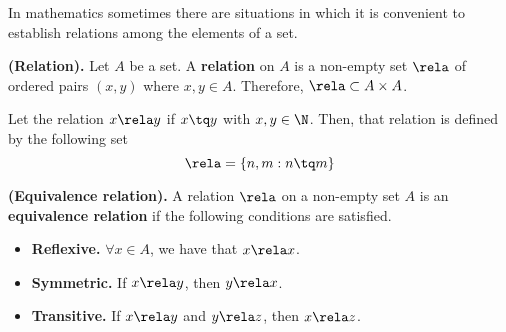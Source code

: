 In mathematics sometimes there are situations in which it is convenient to establish relations among the elements of a set.

\begin{definition}
    \textbf{(Relation).} Let $A$ be a set. A \textbf{relation} on $A$ is a non-empty set $\rela$ of ordered pairs $\left( x, y \right) $ where $x, y\in A$. Therefore, $\rela\subset A\times A$.
\end{definition}

\begin{example}[]
   Let the relation $x\rela y$ if $x\tq y$ with $x, y\in\N$. Then, that relation is defined by the following set
   \begin{equation}
       \rela = \{n, m : n\tq m\} 
   \end{equation}
\end{example}

\begin{definition}
    \textbf{(Equivalence relation).} A relation $\rela$ on a non-empty set $A$ is an \textbf{equivalence relation} if the following conditions are satisfied.
    \begin{itemize}
        \item\textbf{Reflexive.} $\forall x\in A$, we have that $x\rela x$.
        \item\textbf{Symmetric.} If $x\rela y$, then $y\rela x$.
        \item\textbf{Transitive.} If $x\rela y$ and $y\rela z$, then $x\rela z$.
    \end{itemize}
\end{definition}

